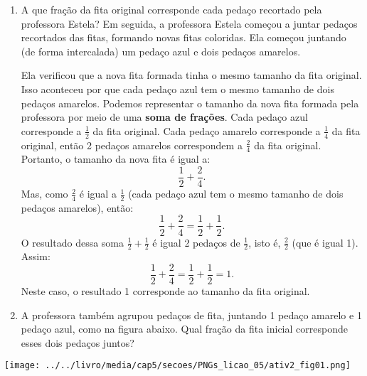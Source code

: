 \begin{enumerate} [\quad a)] %
  \item     A que fração da fita original corresponde cada pedaço recortado pela professora Estela?    \mbox{} \newline           \mbox{} \newline      Em seguida, a professora Estela começou a juntar pedaços recortados das fitas, formando novas fitas coloridas. Ela começou juntando (de forma intercalada) um pedaço azul e dois pedaços amarelos.     \mbox{} \newline      

\begin{center}
\end{center}

Ela verificou que a nova fita formada tinha o mesmo tamanho da fita original. Isso aconteceu por que cada pedaço azul tem o mesmo tamanho de dois pedaços amarelos. Podemos representar o tamanho da nova fita formada pela professora por meio de uma {\bf soma de frações}. Cada pedaço azul corresponde a $\frac{1}{2}$ da fita original. Cada pedaço amarelo corresponde a $\frac{1}{4}$ da fita original, então 2 pedaços amarelos correspondem a $\frac{2}{4}$ da fita original. Portanto, o tamanho da nova fita é igual a: $$\dfrac{1}{2} + \dfrac{2}{4}.$$ Mas, como $\frac{2}{4}$ é igual a $\frac{1}{2}$ (cada pedaço azul tem o mesmo tamanho de dois pedaços amarelos), então: $$\dfrac{1}{2} + \dfrac{2}{4} = \dfrac{1}{2} + \dfrac{1}{2}.$$ O resultado dessa soma $\frac{1}{2} + \frac{1}{2}$ é igual 2 pedaços de $\frac{1}{2}$, isto é, $\frac{2}{2}$ (que é igual 1). Assim: $$\dfrac{1}{2} + \dfrac{2}{4} = \dfrac{1}{2} + \dfrac{1}{2} = 1.$$ Neste caso, o resultado 1 corresponde ao tamanho da fita original.
  \item     A professora também agrupou pedaços de fita, juntando 1 pedaço amarelo e 1 pedaço azul, como na figura abaixo. Qual fração da fita inicial corresponde esses dois pedaços juntos?
\end{enumerate} %

\begin{center}
\texttt{[image: ../../livro/media/cap5/secoes/PNGs\_licao\_05/ativ2\_fig01.png]}
\end{center}


